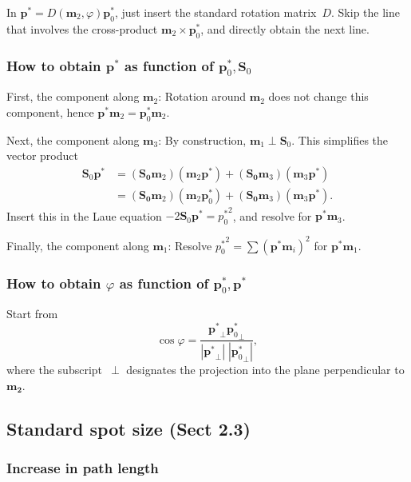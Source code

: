 \documentclass[11pt,a4paper]{article}
\def\v#1{\mathbf{#1}}
\begin{document}
In $\v{p}^*=D(\v{m}_2,\varphi)\v{p}^*_0$, just insert the standard rotation matrix~$D$.
Skip the line that involves the cross-product $\v{m}_2\times\v{p}^*_0$,
and directly obtain the next line.

\subsubsection{How to obtain $\v{p}^*$ as function of $\v{p}^*_0,\v{S}_0$}

First, the component along $\v{m}_2$: Rotation around $\v{m}_2$ does not change this component,
hence $\v{p}^*\v{m}_2 = \v{p}^*_0\v{m}_2$.

Next, the component along $\v{m}_3$:
By construction, $\v{m}_1\perp\v{S}_0$.
This simplifies the vector product
\begin{equation}
\begin{array}{ll}
   \v{S}_0\v{p}^*&=(\v{S_0}\v{m}_2)(\v{m}_2\v{p}^*) + (\v{S_0}\v{m}_3)(\v{m}_3\v{p}^*)
\\
                &=(\v{S_0}\v{m}_2)(\v{m}_2\v{p}^*_0) + (\v{S_0}\v{m}_3)(\v{m}_3\v{p}^*).
\end{array}
\end{equation}
Insert this in the Laue equation $-2\v{S}_0\v{p}^*={p^*_0}^2$,
and resolve for $\v{p}^*\v{m}_3$.

Finally, the component along $\v{m}_1$:
Resolve ${p^*_0}^2=\sum {(\v{p}^*\v{m}_i)}^2$ for $\v{p}^*\v{m}_1$.

\subsubsection{How to obtain $\varphi$ as function of $\v{p}^*_0,\v{p}^*$}

Start from
\begin{equation}
  \cos\varphi=\frac{{\v{p}^*}_\perp{\v{p}^*_0}_\perp}{|{\v{p}^*}_\perp|\;|{\v{p}^*_0}_\perp|},
\end{equation}
where the subscript~$\perp$ designates the projection into the plane
perpendicular to $\v{m_2}$.

\subsection{Standard spot size (Sect 2.3)}

\subsubsection{Increase in path length}
\end{document}
